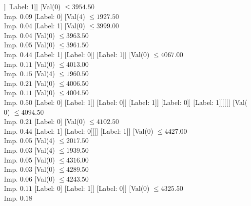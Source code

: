 \documentclass[margin=10pt]{standalone}
\begin{document}
\begin{forest}
							[Val($0$) $ \leq 4081.50$ \\ Imp. $0.03$
								[Val($0$) $ \leq 3944.50$ \\ Imp. $0.02$
									[Val($0$) $ \leq 3915.50$ \\ Imp. $0.02$
										[Val($0$) $ \leq 3878.00$ \\ Imp. $0.32$
											[Label: 1]
											[Label: 0]]
										[Label: 1]]
									[Val($0$) $ \leq 3954.50$ \\ Imp. $0.09$
										[Label: 0]
										[Val($4$) $ \leq 1927.50$ \\ Imp. $0.04$
											[Label: 1]
											[Val($0$) $ \leq 3999.00$ \\ Imp. $0.04$
												[Val($0$) $ \leq 3963.50$ \\ Imp. $0.05$
													[Val($0$) $ \leq 3961.50$ \\ Imp. $0.44$
														[Label: 1]
														[Label: 0]]
													[Label: 1]]
												[Val($0$) $ \leq 4067.00$ \\ Imp. $0.11$
													[Val($0$) $ \leq 4013.00$ \\ Imp. $0.15$
														[Val($4$) $ \leq 1960.50$ \\ Imp. $0.21$
															[Val($0$) $ \leq 4006.50$ \\ Imp. $0.11$
																[Val($0$) $ \leq 4004.50$ \\ Imp. $0.50$
																	[Label: 0]
																	[Label: 1]]
																[Label: 0]]
															[Label: 1]]
														[Label: 0]]
													[Label: 1]]]]]]
								[Val($0$) $ \leq 4094.50$ \\ Imp. $0.21$
									[Label: 0]
									[Val($0$) $ \leq 4102.50$ \\ Imp. $0.44$
										[Label: 1]
										[Label: 0]]]]
							[Label: 1]]
						[Val($0$) $ \leq 4427.00$ \\ Imp. $0.05$
							[Val($4$) $ \leq 2017.50$ \\ Imp. $0.03$
								[Val($4$) $ \leq 1939.50$ \\ Imp. $0.05$
									[Val($0$) $ \leq 4316.00$ \\ Imp. $0.03$
										[Val($0$) $ \leq 4289.50$ \\ Imp. $0.06$
											[Val($0$) $ \leq 4243.50$ \\ Imp. $0.11$
												[Label: 0]
												[Label: 1]]
											[Label: 0]]
										[Val($0$) $ \leq 4325.50$ \\ Imp. $0.18$

\end{forest}
\end{document}
